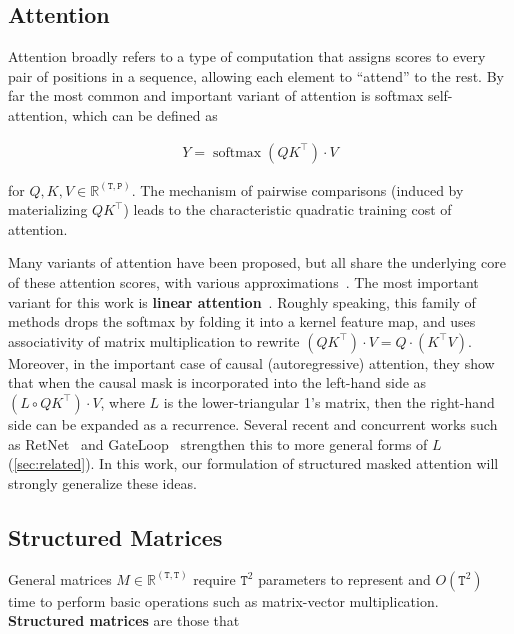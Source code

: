\subsection{Attention}
\label{sec:overview:attention}

Attention broadly refers to a type of computation that assigns scores to every pair of positions in a sequence, allowing each element to ``attend'' to the rest. By far the most common and important variant of attention is softmax self-attention, which can be defined as

\begin{align*}
  Y = \operatorname*{softmax}(QK^{\top}) \cdot V
\end{align*}

for $Q, K, V \in \mathbb{R}^{\mathtt{(T,P)}}$.
The mechanism of pairwise comparisons (induced by materializing $QK^{\top}$) leads to the characteristic quadratic training cost of attention.

Many variants of attention have been proposed, but all share the underlying core of these attention scores, with various approximations~\citep{tay2022efficient}.
The most important variant for this work is \textbf{linear attention}~\citep{katharopoulos2020transformers}.
Roughly speaking, this family of methods drops the softmax by folding it into a kernel feature map, and uses associativity of matrix multiplication to rewrite
$(QK^{\top}) \cdot V = Q \cdot (K^{\top} V)$. Moreover, in the important case of causal (autoregressive) attention, they show that when the causal mask is incorporated into the left-hand side as $(L \circ QK^{\top}) \cdot V$, where $L$ is the lower-triangular 1's matrix, then the right-hand side can be expanded as a recurrence. Several recent and concurrent works such as RetNet~\citep{sun2023retentive} and GateLoop~\citep{katsch2023gateloop} strengthen this to more general forms of $L$ (\ref{sec:related}).
In this work, our formulation of structured masked attention will strongly generalize these ideas.

\subsection{Structured Matrices}
\label{sec:overview:structured-matrix}

General matrices $M \in \mathbb{R}^{\mathtt{(T,T)}}$ require $\mathtt{T}^2$ parameters to represent and $O(\mathtt{T}^2)$ time to perform basic operations such as matrix-vector multiplication.
\textbf{Structured matrices} are those that

